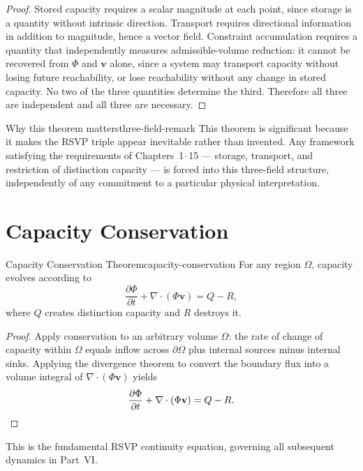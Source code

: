 \documentclass[12pt,twoside,openright]{book}
\begin{document}
\begin{proof}
  Stored capacity requires a scalar magnitude at each
  point, since storage is a quantity without intrinsic
  direction. Transport requires directional information
  in addition to magnitude, hence a vector field. Constraint
  accumulation requires a quantity that independently
  measures admissible-volume reduction: it cannot be
  recovered from $\Phi$ and $\mathbf{v}$ alone, since a
  system may transport capacity without losing future
  reachability, or lose reachability without any change in
  stored capacity. No two of the three quantities determine
  the third. Therefore all three are independent and all
  three are necessary.
\end{proof}

\begin{remark}{Why this theorem matters}{three-field-remark}
  This theorem is significant because it makes the RSVP
  triple appear inevitable rather than invented. Any
  framework satisfying the requirements of
  Chapters~1--15 --- storage, transport, and restriction of
  distinction capacity --- is forced into this three-field
  structure, independently of any commitment to a
  particular physical interpretation.
\end{remark}

\section{Capacity Conservation}
\label{sec:ch16-conservation}

\begin{theorem}{Capacity Conservation Theorem}{capacity-conservation}
  For any region $\Omega$, capacity evolves according to
  \[
    \frac{\partial \Phi}{\partial t}
    + \nabla\cdot(\Phi\mathbf{v})
    = Q - R,
  \]
  where $Q$ creates distinction capacity and $R$ destroys it.
\end{theorem}

\begin{proof}
  Apply conservation to an arbitrary volume $\Omega$: the
  rate of change of capacity within $\Omega$ equals inflow
  across $\partial\Omega$ plus internal sources minus
  internal sinks. Applying the divergence theorem to convert
  the boundary flux into a volume integral of
  $\nabla\cdot(\Phi\mathbf{v})$ yields
  \[
    \frac{\partial \Phi}{\partial t}
    + \nabla\cdot(\Phi\mathbf{v})
    = Q - R. \qedhere
  \]
\end{proof}

This is the fundamental RSVP continuity equation, governing
all subsequent dynamics in Part~VI.
\end{document}

